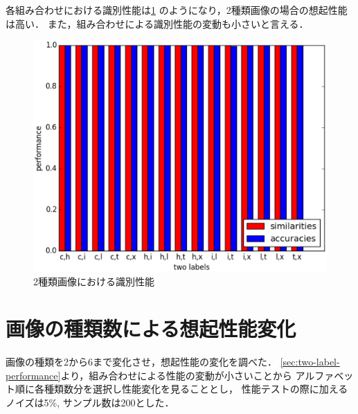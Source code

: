 \documentclass[10pt,twocolumn]{jarticle}
\newcommand{\figref}[1]{\figurename\ref{fig:#1}}
\begin{document}
各組み合わせにおける識別性能は\figref{two-label-performance}
のようになり，2種類画像の場合の想起性能は高い．
また，組み合わせによる識別性能の変動も小さいと言える．
\begin{figure}[htpb]
  \centering
    \includegraphics[width=\columnwidth]{figs/two_label_performance}
    \caption{2種類画像における識別性能}
    \label{fig:two-label-performance}
\end{figure}


\section{画像の種類数による想起性能変化}
画像の種類を2から6まで変化させ，想起性能の変化を調べた．
\ref{sec:two-label-performance}より，組み合わせによる性能の変動が小さいことから
アルファベット順に各種類数分を選択し性能変化を見ることとし，
性能テストの際に加えるノイズは5\%, サンプル数は200とした．
\end{document}
